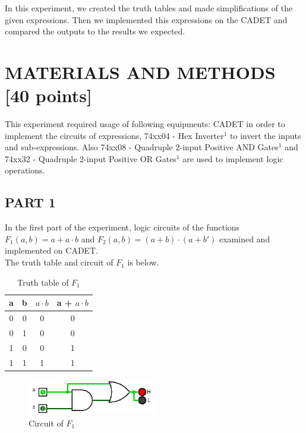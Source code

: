 \documentclass[pdftex,12pt,a4paper]{article}
\begin{document}
In this experiment, we created the truth tables and made simplifications of the given expressions. Then we implemented this expressions on the CADET and compared the outputs to the results we expected.  

\section{MATERIALS AND METHODS [40 points]}
This experiment required usage of following equipments: CADET in order to implement the circuits of expressions, 74xx04 - Hex Inverter$^{1}$ to invert the inputs and sub-expressions. Also 74xx08 - Quadruple 2-input Positive AND Gates$^{1}$ and 74xx32 - Quadruple 2-input Positive OR Gates$^{1}$ are used to implement logic operations.

\subsection{PART 1}
In the first part of the experiment, logic circuits of the functions $F_1(a, b) = a + a \cdot b$ and $F_2(a, b) = (a + b) \cdot (a + b')$ examined and implemented on CADET. \\

The truth table and circuit of $F_1$ is below. 

\begin{table}[h]
    \centering
    \begin{tabular}{|c|c|c|c|}
    \hline
    a & b & $a \cdot b$ & a + $a \cdot b$ \\ \hline
    0 & 0 &       0     & 0         \\
    0 & 1 &       0     & 0         \\
    1 & 0 &       0     & 1         \\
    1 & 1 &       1     & 1         \\ \hline
    \end{tabular}
    \caption{Truth table of $F_1$}
    \label{fig1}
\end{table}

\begin{figure}[ht]
	\centering
	\includegraphics[width=0.5\textwidth]{2_1.png}	
	\caption{Circuit of $F_1$}
	\label{fig1}
\end{figure}
\end{document}
